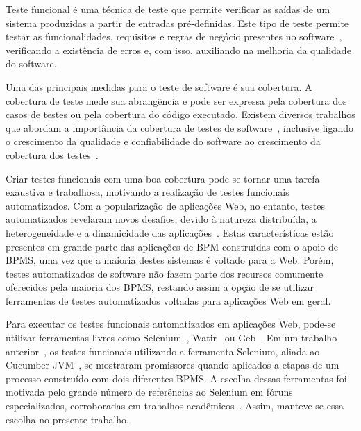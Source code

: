 \documentclass[12pt]{article}
\begin{document}
Teste funcional é uma técnica de teste que permite verificar as saídas de um sistema produzidas a partir de entradas pré-definidas. Este tipo de teste permite testar as funcionalidades, requisitos e regras de negócio presentes no software~\cite{Delamaro:2007}, verificando a existência de erros e, com isso, auxiliando na melhoria da qualidade do software.

Uma das principais medidas para o teste de software é sua cobertura. A cobertura de teste mede sua abrangência e pode ser expressa pela cobertura dos casos de testes ou pela cobertura do código executado. Existem diversos trabalhos que abordam a importância da cobertura de testes de software~\cite{zhu1997software, bieman1996using}, inclusive ligando o crescimento da qualidade e confiabilidade do software ao crescimento da cobertura dos testes~\cite{malaiya2002software}.





Criar testes funcionais com uma boa cobertura pode se tornar uma tarefa exaustiva e trabalhosa, motivando a realização de testes funcionais automatizados. Com a popularização de aplicações Web, no entanto, testes automatizados revelaram novos desafios, devido à natureza distribuída, a heterogeneidade e a dinamicidade das aplicações~\cite{webtest:2013}. Estas características estão presentes em grande parte das aplicações de BPM construídas com o apoio de BPMS, uma vez que a maioria destes sistemas é voltado para a Web. Porém, testes automatizados de software não fazem parte dos recursos comumente oferecidos pela maioria dos BPMS, restando assim a opção de se utilizar ferramentas de testes automatizados voltadas para aplicações Web em geral.

Para executar os testes funcionais automatizados em aplicações Web, pode-se utilizar ferramentas livres como Selenium~\cite{selenium}, Watir~\cite{watir} ou Geb~\cite{geb}. Em um trabalho anterior~\cite{sbqs2015}, os testes funcionais utilizando a ferramenta Selenium, aliada ao Cucumber-JVM~\cite{cucumber}, se mostraram promissores quando aplicados a etapas de um processo construído com dois diferentes BPMS. A escolha dessas ferramentas foi motivada pelo grande número de referências ao Selenium em fóruns especializados, corroboradas em trabalhos acadêmicos~\cite{sbqs2013, sbqs2015:compara}. Assim, manteve-se essa escolha no presente trabalho.
\end{document}
